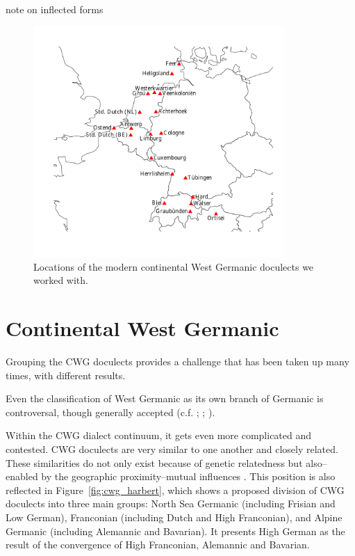 \documentclass[a4paper]{article}
\begin{document}
note on inflected forms

\begin{figure}[h]
\centering
\includegraphics[width=0.85\textwidth]{figures/map.pdf}
\caption{Locations of the modern continental West Germanic doculects we worked with.}
\label{fig:map}
\end{figure}


\section{Continental West Germanic}
\label{sec:cwg}

Grouping the CWG doculects provides a challenge
that has been taken up many times, with different results.

Even the classification of West Germanic
as its own branch of Germanic is controversal,
though generally accepted
(c.f. \citet{voyles1971problem}; \citet[pp. 7-8]{harbert2007germanic}; \citet{ringe2012cladistic}). %

Within the CWG dialect continuum, it gets even more complicated and contested.
CWG doculects are very similar to one another and closely related.
These similarities do not only exist because of genetic relatedness
but also--enabled by the geographic proximity--mutual influences
\citep[p. 8]{harbert2007germanic}.
This position is also reflected in Figure~\ref{fig:cwg_harbert},
which shows a proposed division of CWG doculects
into three main groups: North Sea Germanic (including Frisian and Low German),
Franconian (including Dutch and High Franconian),
and Alpine Germanic (including Alemannic and Bavarian).
It presents High German as the result of the convergence
of High Franconian, Alemannic and Bavarian.
\end{document}
